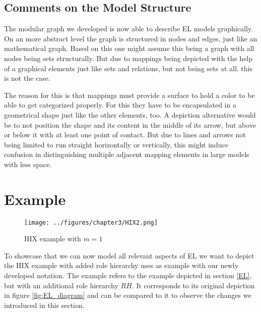 \documentclass[twoside, openright, 12pt]{book}
\begin{document}
\subsection{Comments on the Model Structure}
\label{comments_on_model_structure}
The modular graph we developed is now able to describe EL models graphically.
On an more abstract level the graph is structured in nodes and edges, just like an mathematical graph.
Based on this one might assume this being a graph with all nodes being sets structurally.
But due to mappings being depicted with the help of a graphical elements just like sets and relations, but not being sets at all, this is not the case.

The reason for this is that mappings must provide a surface to hold a color to be able to get categorized properly.
For this they have to be encapsulated in a geometrical shape just like the other elements, too.
A depiction alternative would be to not position the shape and its content in the middle of its arrow, but above or below it with at least one point of contact.
But due to lines and arrows not being limited to run straight horizontally or vertically, this might induce confusion in distinguishing multiple adjacent mapping elements in large models with less space.



\section{Example}
\label{gsl_example}

\begin{figure}[htb]
	\centering
	\texttt{[image: ../figures/chapter3/HIX2.png]}
	\caption{HIX example with $m=1$ \citep{Amthor18}}
	\label{fig:HIX2}
\end{figure}

\noindent
To showcase that we can now model all relevant aspects of EL we want to depict the HIX example with added role hierarchy \cite{Amthor18} uses as example with our newly developed notation.
The example refers to the example depicted in section \ref{EL}, but with an additional role hierarchy $RH$.
It corresponds to its original depiction in figure \ref{fig:EL_diagram} and can be compared to it to observe the changes we introduced in this section.
\end{document}
